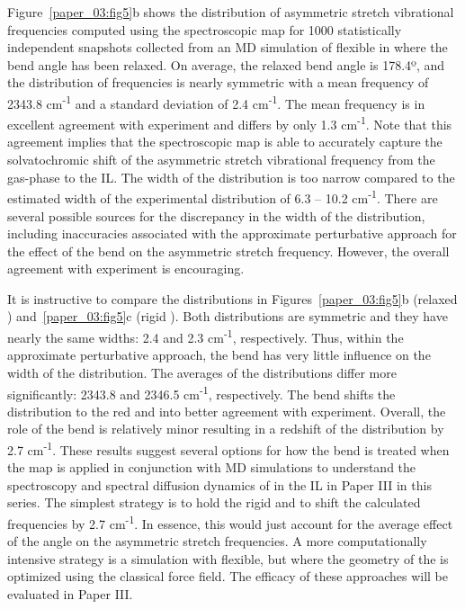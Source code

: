 \documentclass[]{article}
\begin{document}
Figure~\ref{paper_03:fig5}b shows the distribution of  asymmetric stretch vibrational frequencies computed using the spectroscopic map for 1000 statistically independent snapshots collected from an MD simulation of flexible  in \ce{[C4C1im][PF6]} where the  bend angle has been relaxed. On average, the relaxed bend angle is 178.4º, and the distribution of frequencies is nearly symmetric with a mean frequency of 2343.8 cm\textsuperscript{-1} and a standard deviation of 2.4 cm\textsuperscript{-1}. The mean frequency is in excellent agreement with experiment and differs by only 1.3 cm\textsuperscript{-1}. Note that this agreement implies that the spectroscopic map is able to accurately capture the solvatochromic shift of the  asymmetric stretch vibrational frequency from the gas-phase to the \ce{[C4C1im][PF6]} IL. The width of the distribution is too narrow compared to the estimated width of the experimental distribution of 6.3 -- 10.2 cm\textsuperscript{-1}. There are several possible sources for the discrepancy in the width of the distribution, including inaccuracies associated with the approximate perturbative approach for the effect of the bend on the asymmetric stretch frequency. However, the overall agreement with experiment is encouraging.

It is instructive to compare the distributions in Figures~\ref{paper_03:fig5}b (relaxed ) and~\ref{paper_03:fig5}c (rigid ). Both distributions are symmetric and they have nearly the same widths: 2.4 and 2.3 cm\textsuperscript{-1}, respectively. Thus, within the approximate perturbative approach, the bend has very little influence on the width of the distribution. The averages of the distributions differ more significantly: 2343.8 and 2346.5 cm\textsuperscript{-1}, respectively. The bend shifts the distribution to the red and into better agreement with experiment. Overall, the role of the bend is relatively minor resulting in a redshift of the distribution by 2.7 cm\textsuperscript{-1}. These results suggest several options for how the bend is treated when the map is applied in conjunction with MD simulations to understand the spectroscopy and spectral diffusion dynamics of  in the \ce{[C4C1im][PF6]} IL in Paper III in this series. The simplest strategy is to hold the  rigid and to shift the calculated frequencies by 2.7 cm\textsuperscript{-1}. In essence, this would just account for the average effect of the  angle on the asymmetric stretch frequencies. A more computationally intensive strategy is a simulation with  flexible, but where the geometry of the  is optimized using the classical force field.  The efficacy of these approaches will be evaluated in Paper III.
\end{document}
